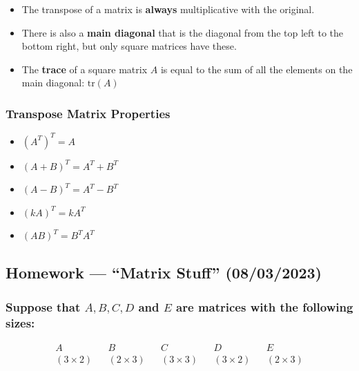 \documentclass[
  letterpaper,
  DIV=11,
  numbers=noendperiod]{scrartcl}
\providecommand{\tightlist}{%
  \setlength{\itemsep}{0pt}\setlength{\parskip}{0pt}}\usepackage{longtable,booktabs,array}
\begin{document}
\begin{itemize}
\tightlist
\item
  The transpose of a matrix is \textbf{always} multiplicative with the
  original.
\item
  There is also a \textbf{main diagonal} that is the diagonal from the
  top left to the bottom right, but only square matrices have these.
\item
  The \textbf{trace} of a square matrix \(A\) is equal to the sum of all
  the elements on the main diagonal: \(\mathrm{tr}(A)\)
\end{itemize}

\hypertarget{transpose-matrix-properties}{%
\subsubsection{Transpose Matrix
Properties}\label{transpose-matrix-properties}}

\begin{itemize}
\tightlist
\item
  \((A^T)^T = A\)
\item
  \((A + B)^T = A^T + B^T\)
\item
  \((A - B)^T = A^T - B^T\)
\item
  \((kA)^T = kA^T\)
\item
  \((AB)^T = B^T A^T\)
\end{itemize}

\hypertarget{homework-matrix-stuff-08032023}{%
\subsection{Homework --- ``Matrix Stuff''
(08/03/2023)}\label{homework-matrix-stuff-08032023}}

\hypertarget{suppose-that-a-b-c-d-and-e-are-matrices-with-the-following-sizes}{%
\subsubsection{\texorpdfstring{Suppose that \(A, B, C, D\) and \(E\) are
matrices with the following
sizes:}{Suppose that A, B, C, D and E are matrices with the following sizes:}}\label{suppose-that-a-b-c-d-and-e-are-matrices-with-the-following-sizes}}

\begin{align*}
&A& &B& &C& &D& &E& \\
&(3 \times 2)& &(2 \times 3)& &(3 \times 3)& &(3 \times 2)& &(2 \times 3)&
\end{align*}
\end{document}
